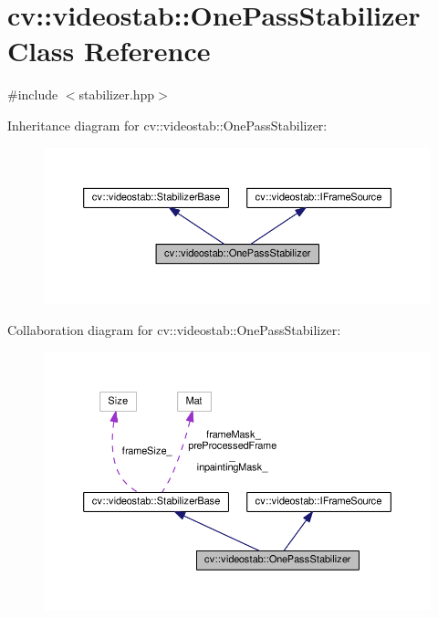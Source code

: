 \hypertarget{classcv_1_1videostab_1_1OnePassStabilizer}{\section{cv\-:\-:videostab\-:\-:One\-Pass\-Stabilizer Class Reference}
\label{classcv_1_1videostab_1_1OnePassStabilizer}
}


{\ttfamily \#include $<$stabilizer.\-hpp$>$}



Inheritance diagram for cv\-:\-:videostab\-:\-:One\-Pass\-Stabilizer\-:\nopagebreak
\begin{figure}[H]
\begin{center}
\leavevmode
\includegraphics[width=350pt]{classcv_1_1videostab_1_1OnePassStabilizer__inherit__graph}
\end{center}
\end{figure}


Collaboration diagram for cv\-:\-:videostab\-:\-:One\-Pass\-Stabilizer\-:\nopagebreak
\begin{figure}[H]
\begin{center}
\leavevmode
\includegraphics[width=350pt]{classcv_1_1videostab_1_1OnePassStabilizer__coll__graph}
\end{center}
\end{figure}
